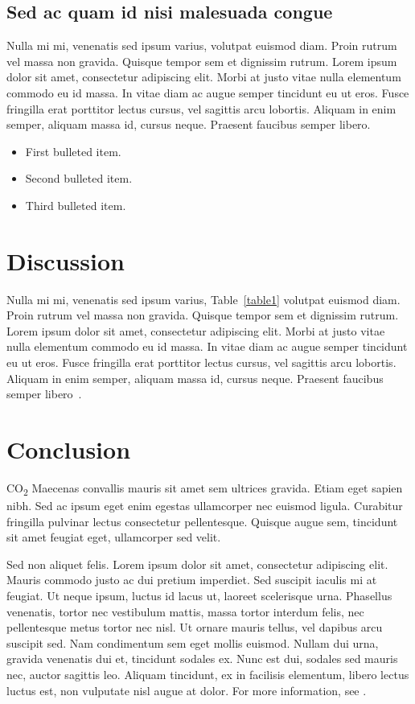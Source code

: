 \documentclass[10pt,letterpaper]{article}
\begin{document}
\subsection*{Sed ac quam id nisi malesuada congue}

Nulla mi mi, venenatis sed ipsum varius, volutpat euismod diam. Proin rutrum vel massa non gravida. Quisque tempor sem et dignissim rutrum. Lorem ipsum dolor sit amet, consectetur adipiscing elit. Morbi at justo vitae nulla elementum commodo eu id massa. In vitae diam ac augue semper tincidunt eu ut eros. Fusce fringilla erat porttitor lectus cursus, vel sagittis arcu lobortis. Aliquam in enim semper, aliquam massa id, cursus neque. Praesent faucibus semper libero.

\begin{itemize}
	\item First bulleted item.
	\item Second bulleted item.
	\item Third bulleted item.
\end{itemize}

\section*{Discussion}
Nulla mi mi, venenatis sed ipsum varius, Table~\ref{table1} volutpat euismod diam. Proin rutrum vel massa non gravida. Quisque tempor sem et dignissim rutrum. Lorem ipsum dolor sit amet, consectetur adipiscing elit. Morbi at justo vitae nulla elementum commodo eu id massa. In vitae diam ac augue semper tincidunt eu ut eros. Fusce fringilla erat porttitor lectus cursus, vel sagittis arcu lobortis. Aliquam in enim semper, aliquam massa id, cursus neque. Praesent faucibus semper libero~\cite{bib3}.

\section*{Conclusion}

CO\textsubscript{2} Maecenas convallis mauris sit amet sem ultrices gravida. Etiam eget sapien nibh. Sed ac ipsum eget enim egestas ullamcorper nec euismod ligula. Curabitur fringilla pulvinar lectus consectetur pellentesque. Quisque augue sem, tincidunt sit amet feugiat eget, ullamcorper sed velit.

Sed non aliquet felis. Lorem ipsum dolor sit amet, consectetur adipiscing elit. Mauris commodo justo ac dui pretium imperdiet. Sed suscipit iaculis mi at feugiat. Ut neque ipsum, luctus id lacus ut, laoreet scelerisque urna. Phasellus venenatis, tortor nec vestibulum mattis, massa tortor interdum felis, nec pellentesque metus tortor nec nisl. Ut ornare mauris tellus, vel dapibus arcu suscipit sed. Nam condimentum sem eget mollis euismod. Nullam dui urna, gravida venenatis dui et, tincidunt sodales ex. Nunc est dui, sodales sed mauris nec, auctor sagittis leo. Aliquam tincidunt, ex in facilisis elementum, libero lectus luctus est, non vulputate nisl augue at dolor. For more information, see .
\end{document}
